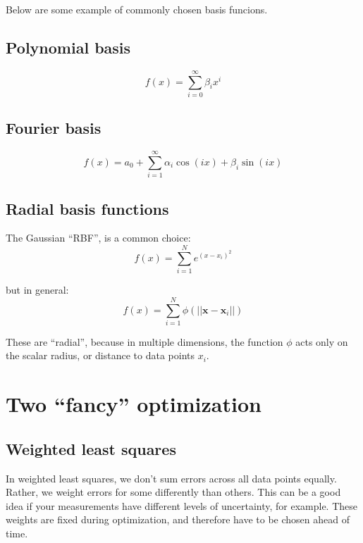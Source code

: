 \documentclass[11pt]{article}
\newcommand\xvec{\boldsymbol{x}}
\begin{document}
Below are some example of commonly chosen basis funcions.

\subsection{ Polynomial basis }

\begin{equation}
    f(x) = \sum_{i=0}^{\infty} \beta_i x^i
\end{equation}

\subsection{ Fourier basis }

\begin{equation}
    f(x) = a_0 + \sum_{i=1}^{\infty} \alpha_i \cos( ix ) + \beta_i \sin( ix)
\end{equation}

\subsection{ Radial basis functions }


The Gaussian ``RBF'', is a common choice:
\begin{equation}
  f(x) = \sum_{i=1}^{N} e^{(x - x_i)^2}
\end{equation}

but in general:
\begin{equation}
  f(x) = \sum_{i=1}^{N} \phi( || \xvec - \xvec_i || )
\end{equation}

These are ``radial'', because in multiple dimensions, the function
$\phi$ acts only on the scalar radius, or distance to data points $x_i$.

\section{ Two ``fancy'' optimization }

\subsection{ Weighted least squares }

In weighted least squares, we don't sum errors across all data points
equally.  Rather, we weight errors for some differently than others.
This can be a good idea if your measurements have different levels of
uncertainty, for example.  These weights are fixed during optimization,
and therefore have to be chosen ahead of time.
\end{document}
